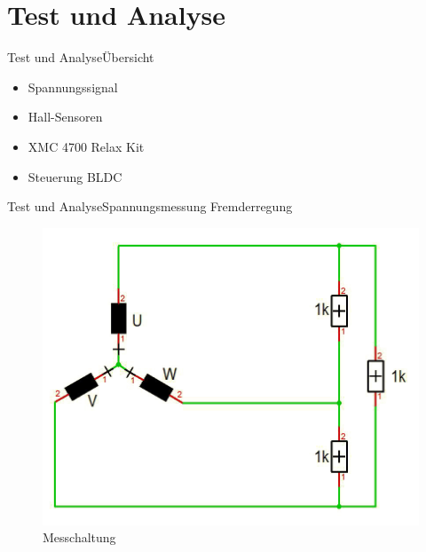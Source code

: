 \author{Christian Brunner}
\section{Test und Analyse}

\begin{frame}{Test und Analyse}{Übersicht}
	\begin{itemize}	
		\item Spannungssignal
		\item Hall-Sensoren
		\item XMC 4700 Relax Kit
		\item Steuerung BLDC
	\end{itemize}
\end{frame}

\begin{frame}{Test und Analyse}{Spannungsmessung Fremderregung}
	\begin{figure}
		\includegraphics[height=\textheight]{Test/Messchaltung_Fremderregung}
		\caption{Messchaltung}
	\end{figure}
\end{frame}

